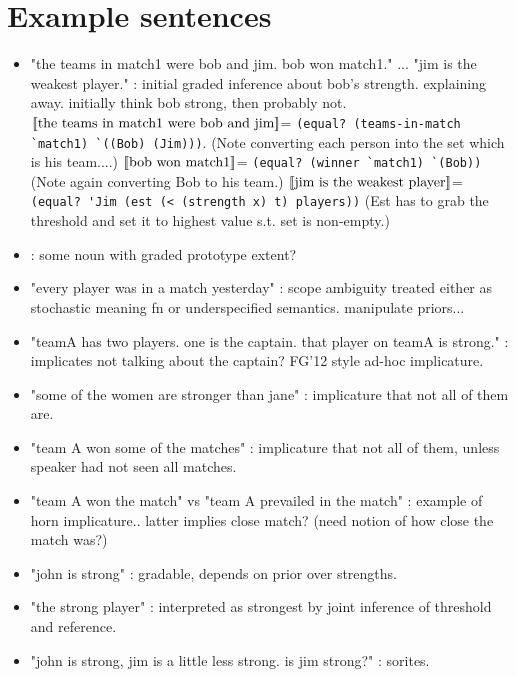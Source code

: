 \documentclass[12pt]{article}
\newcommand{\llbracket}{\ensuremath{\left [\!\left [}}%
\newcommand{\rrbracket}{\ensuremath{\right ]\!\right ]}}
\providecommand{\textsv}[1]{\ensuremath{\llbracket \text{#1} \rrbracket}}
\begin{document}
%
\pagebreak

\section{Example sentences}
\begin{itemize}
\item "the teams in match1 were bob and jim. bob won match1." ... "jim is the weakest player." : initial graded inference about bob's strength. explaining away. initially think bob strong, then probably not.
\subitem \textsv{the teams in match1 were bob and jim}= \lstinline{(equal? (teams-in-match `match1) `((Bob) (Jim)))}. (Note converting each person into the set which is his team....)
\subitem \textsv{bob won match1}= \lstinline{(equal? (winner `match1) `(Bob))} (Note again converting Bob to his team.)
\subitem \textsv{jim is the weakest player}= \lstinline{(equal? 'Jim (est (< (strength x) t) players))}  (Est has to grab the threshold and set it to highest value s.t. set is non-empty.) 


\item : some noun with graded  prototype extent?
\item "every player was in a match yesterday" : scope ambiguity treated either as stochastic meaning fn or underspecified semantics. manipulate priors...
\item "teamA has two players. one is the captain. that player on teamA is strong." : implicates not talking about the captain?  FG'12 style ad-hoc implicature.
\item "some of the women are stronger than jane" : implicature that not all of them are.
\item "team A won some of the matches" : implicature that not all of them, unless speaker had not seen all matches.
\item "team A won the match" vs "team A prevailed in the match" : example of horn implicature.. latter implies close match? (need notion of how close the match was?)
\item "john is strong" : gradable, depends on prior over strengths.
\item "the strong player" : interpreted as strongest by joint inference of threshold and reference.
\item "john is strong, jim is a little less strong. is jim strong?" : sorites.
\end{itemize}
\end{document}

